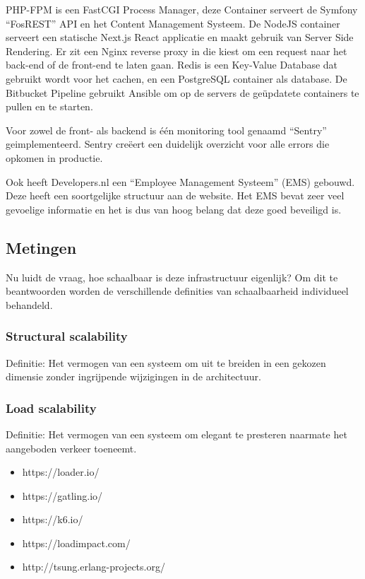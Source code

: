 PHP-FPM is een FastCGI Process Manager, deze Container serveert de Symfony “FosREST” API en het Content Management Systeem. De NodeJS container serveert een statische Next.js React applicatie en maakt gebruik van Server Side Rendering. Er zit een Nginx reverse proxy in die kiest om een request naar het back-end of de front-end te laten gaan. Redis is een Key-Value Database dat gebruikt wordt voor het cachen, en een PostgreSQL container als database. De Bitbucket Pipeline gebruikt Ansible om op de servers de geüpdatete containers te pullen en te starten.

Voor zowel de front- als backend is één monitoring tool genaamd \enquote{Sentry} geimplementeerd. Sentry creëert een duidelijk overzicht voor alle errors die opkomen in productie.

Ook heeft Developers.nl een \enquote{Employee Management Systeem} (EMS) gebouwd. Deze heeft een soortgelijke structuur aan de website. Het EMS bevat zeer veel gevoelige informatie en het is dus van hoog belang dat deze goed beveiligd is.

\subsection{Metingen}

Nu luidt de vraag, hoe schaalbaar is deze infrastructuur eigenlijk? Om dit te beantwoorden worden de verschillende definities van schaalbaarheid individueel behandeld. 

\subsubsection{Structural scalability}
Definitie: Het vermogen van een systeem om uit te breiden in een gekozen dimensie zonder ingrijpende wijzigingen in de architectuur.


\subsubsection{Load scalability}
Definitie: Het vermogen van een systeem om elegant te presteren naarmate het aangeboden verkeer toeneemt.
\begin{itemize}
	\item https://loader.io/
	\item https://gatling.io/
	\item https://k6.io/
	\item https://loadimpact.com/
	\item http://tsung.erlang-projects.org/
\end{itemize}

